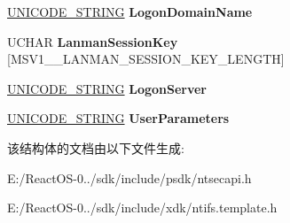\begin{DoxyCompactItemize}
\item 
\mbox{\label{struct___m_s_v1__0___l_m20___l_o_g_o_n___p_r_o_f_i_l_e_a968b706bc0056c748dddebf14a03feb5}} 
\hyperlink{struct___u_n_i_c_o_d_e___s_t_r_i_n_g}{U\+N\+I\+C\+O\+D\+E\+\_\+\+S\+T\+R\+I\+NG} {\bfseries Logon\+Domain\+Name}
\item 
\mbox{\label{struct___m_s_v1__0___l_m20___l_o_g_o_n___p_r_o_f_i_l_e_a633a19b4ffcc92ff524a400cade5fc1b}} 
U\+C\+H\+AR {\bfseries Lanman\+Session\+Key} \mbox{[}M\+S\+V1\+\_\+\_\+\+L\+A\+N\+M\+A\+N\+\_\+\+S\+E\+S\+S\+I\+O\+N\+\_\+\+K\+E\+Y\+\_\+\+L\+E\+N\+G\+TH\mbox{]}
\item 
\mbox{\label{struct___m_s_v1__0___l_m20___l_o_g_o_n___p_r_o_f_i_l_e_a618fee1f7d2d962e4393b750910eea15}} 
\hyperlink{struct___u_n_i_c_o_d_e___s_t_r_i_n_g}{U\+N\+I\+C\+O\+D\+E\+\_\+\+S\+T\+R\+I\+NG} {\bfseries Logon\+Server}
\item 
\mbox{\label{struct___m_s_v1__0___l_m20___l_o_g_o_n___p_r_o_f_i_l_e_aeb221fbfac18ba01d966e64dddbb2cb9}} 
\hyperlink{struct___u_n_i_c_o_d_e___s_t_r_i_n_g}{U\+N\+I\+C\+O\+D\+E\+\_\+\+S\+T\+R\+I\+NG} {\bfseries User\+Parameters}
\end{DoxyCompactItemize}


该结构体的文档由以下文件生成\+:\begin{DoxyCompactItemize}
\item 
E\+:/\+React\+O\+S-\/0../sdk/include/psdk/ntsecapi.\+h\item 
E\+:/\+React\+O\+S-\/0../sdk/include/xdk/ntifs.\+template.\+h\end{DoxyCompactItemize}
